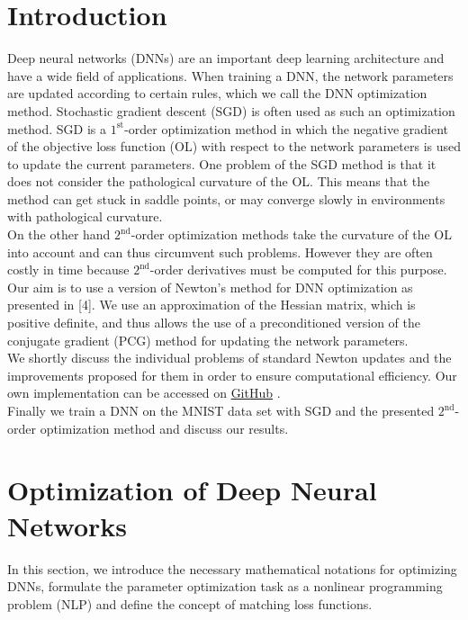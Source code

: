 \documentclass[conference]{IEEEtran}
\begin{document}
	\section{Introduction}
	\noindent
	Deep neural networks (DNNs) are an important deep learning architecture and have a wide field of applications. When training a DNN, the network parameters are updated according to certain rules, which we call the DNN optimization method. Stochastic gradient descent (SGD) is often used as such an optimization method. SGD is a $1^{\text{st}}$-order optimization method in which the negative gradient of the objective loss function (OL) with respect to the network parameters is used to update the current parameters. One problem of the SGD method is that it does not consider the pathological curvature of the OL. This means that the method can get stuck in saddle points, or may converge slowly in environments with pathological curvature.\\
	On the other hand $2^{\text{nd}}$-order optimization methods take the curvature of the OL into account and can thus circumvent such problems. However they are often costly in time because $2^{\text{nd}}$-order derivatives must be computed for this purpose.\\
	Our aim is to use a version of Newton's method for DNN optimization as presented in [4]. We use an approximation of the Hessian matrix, which is positive definite, and thus allows the use of a preconditioned version of the conjugate gradient (PCG) method for updating the network parameters.\\ We shortly discuss the individual problems of standard Newton updates and the improvements proposed for them in order to ensure computational efficiency. Our own implementation can be accessed on \href{https://github.com/NiklasBrunn/Hessian_Free_Optimization_of_Deep_Neural_Networks}{GitHub} .\\
	Finally we train a DNN on the MNIST data set with SGD and the presented $2^{\text{nd}}$-order optimization method and discuss our results.
	
	
	\section{Optimization of Deep Neural Networks}
	\noindent
	In this section, we introduce the necessary mathematical notations for optimizing DNNs, formulate the parameter optimization task as a nonlinear programming problem (NLP) and define the concept of matching loss functions.
\end{document}
